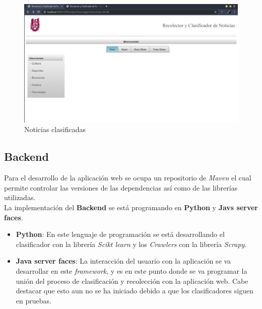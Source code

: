 \begin{figure}[ht]
\centering
\includegraphics[scale=0.3]{imagenes/Aplicacion/mostrarNoticias.png}
\caption{Noticias clasificadas}
\label{fig:mostrarNoticias}
\end{figure}


\subsection{Backend}

Para el desarrollo de la aplicación web se ocupa un repositorio de \textit{Maven} el cual permite controlar las versiones de las dependencias así como de las librerías utilizadas.\\

La implementación del \textbf{Backend} se está programando en \textbf{Python} y \textbf{Javs server faces}.

\begin{itemize}
	\item \textbf{Python}: En este lenguaje de programación se está desarrollando el clasificador con la librería \textit{Scikt learn} y los \textit{Crawlers} con la librería \textit{Scrapy}.

	\item \textbf{Java server faces}: La interacción del usuario con la aplicación se va desarrollar en este \textit{framework}, y es en este punto donde se va programar la unión del proceso de clasificación y recolección con la aplicación web. Cabe destacar que esto aun no se ha iniciado debido a que los clasificadores siguen en pruebas.
\end{itemize}


